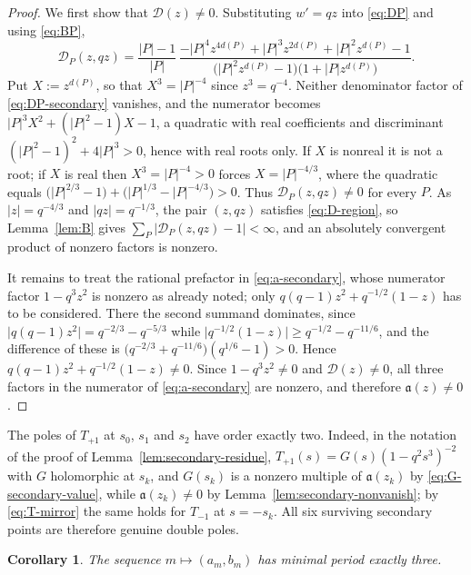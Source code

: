 \documentclass[a4paper,reqno]{amsart}
\numberwithin{equation}{section}
\newtheorem{corollary}[theorem]{Corollary}
\theoremstyle{remark}
\theoremstyle{definition}
\begin{document}
\begin{proof}
We first show that $\mathscr D(z)\ne0$. Substituting $w'=qz$ into
\eqref{eq:DP} and using \eqref{eq:BP},
\begin{equation}\label{eq:DP-secondary}
\mathcal D_P(z,qz)
=\frac{|P|-1}{|P|}\,
\frac{-|P|^4z^{4d(P)}+|P|^3z^{2d(P)}+|P|^2z^{d(P)}-1}
{\bigl(|P|^2z^{d(P)}-1\bigr)\bigl(1+|P|z^{d(P)}\bigr)}.
\end{equation}
Put $X:=z^{d(P)}$, so that $X^3=|P|^{-4}$ since $z^3=q^{-4}$. Neither
denominator factor of \eqref{eq:DP-secondary} vanishes, and the numerator
becomes $|P|^3X^2+(|P|^2-1)X-1$, a quadratic with real coefficients and
discriminant $(|P|^2-1)^2+4|P|^3>0$, hence with real roots only. If $X$ is nonreal it is not a root; if $X$ is real then
$X^3=|P|^{-4}>0$ forces $X=|P|^{-4/3}$, where the quadratic equals
$\bigl(|P|^{2/3}-1\bigr)+\bigl(|P|^{1/3}-|P|^{-4/3}\bigr)>0$. Thus
$\mathcal D_P(z,qz)\ne0$ for every $P$. As $|z|=q^{-4/3}$ and
$|qz|=q^{-1/3}$, the pair $(z,qz)$ satisfies \eqref{eq:D-region}, so
Lemma~\ref{lem:B} gives
$\sum_P\bigl|\mathcal D_P(z,qz)-1\bigr|<\infty$, and an absolutely
convergent product of nonzero factors is nonzero.

It remains to treat the rational prefactor in \eqref{eq:a-secondary}, whose
numerator factor $1-q^3z^2$ is nonzero as already noted; only
$q(q-1)z^2+q^{-1/2}(1-z)$ has to be considered. There the second summand
dominates, since $\bigl|q(q-1)z^2\bigr|=q^{-2/3}-q^{-5/3}$ while
$\bigl|q^{-1/2}(1-z)\bigr|\ge q^{-1/2}-q^{-11/6}$, and the difference of
these is $\bigl(q^{-2/3}+q^{-11/6}\bigr)(q^{1/6}-1)>0$. Hence
$q(q-1)z^2+q^{-1/2}(1-z)\ne0$. Since $1-q^3z^2\ne0$ and
$\mathscr D(z)\ne0$, all three factors in the numerator of
\eqref{eq:a-secondary} are nonzero, and therefore $\mathfrak a(z)\ne0$.
\end{proof}

The poles of $T_{+1}$ at $s_0$, $s_1$ and $s_2$ have order exactly
two. Indeed, in the notation of the proof of
Lemma~\ref{lem:secondary-residue}, $T_{+1}(s)=G(s)(1-q^2s^3)^{-2}$ with
$G$ holomorphic at $s_k$, and $G(s_k)$ is a nonzero multiple of
$\mathfrak a(z_k)$ by \eqref{eq:G-secondary-value}, while
$\mathfrak a(z_k)\ne0$ by Lemma~\ref{lem:secondary-nonvanish}; by
\eqref{eq:T-mirror} the same holds for $T_{-1}$ at $s=-s_k$. All six surviving
secondary points are therefore genuine double poles.

\begin{corollary}
\label{cor:minimal-period}
The sequence $m\mapsto(a_m,b_m)$ has minimal period exactly three.
\end{corollary}
\end{document}
